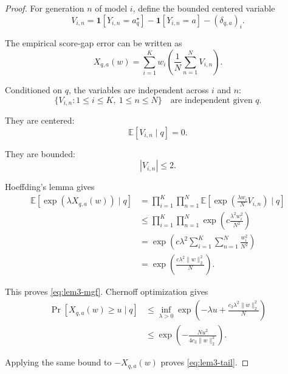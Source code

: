 \documentclass{article} %
\begin{document}
\begin{proof}
For generation \(n\) of model \(i\), define the bounded centered variable
\begin{equation}
\label{eq:lem3-proof-V}
V_{i,n}
=
\mathbf 1\!\left[Y_{i,n}=a_q^\star\right]
-
\mathbf 1\!\left[Y_{i,n}=a\right]
-
(\delta_{q,a})_i .
\end{equation}

The empirical score-gap error can be written as
\begin{equation}
\label{eq:lem3-proof-Xsum}
X_{q,a}(w)
=
\sum_{i=1}^{K}w_i
\left(
\frac1N\sum_{n=1}^{N}V_{i,n}
\right).
\end{equation}

Conditioned on \(q\), the variables are independent across \(i\) and \(n\):
\begin{equation}
\label{eq:lem3-proof-ind}
\{V_{i,n}:1\le i\le K,\ 1\le n\le N\}
\quad\text{are independent given }q .
\end{equation}

They are centered:
\begin{equation}
\label{eq:lem3-proof-centered}
\mathbb E[V_{i,n}\mid q]
=
0 .
\end{equation}

They are bounded:
\begin{equation}
\label{eq:lem3-proof-bounded}
|V_{i,n}|
\le
2 .
\end{equation}

Hoeffding's lemma gives
\begin{align}
\mathbb E\!\left[
\exp\!\left(\lambda X_{q,a}(w)\right)
\mid q
\right]
&=
\prod_{i=1}^{K}\prod_{n=1}^{N}
\mathbb E\!\left[
\exp\!\left(\frac{\lambda w_i}{N}V_{i,n}\right)
\mid q
\right]
\label{eq:lem3-proof-a}
\\
&\le
\prod_{i=1}^{K}\prod_{n=1}^{N}
\exp\!\left(
c\frac{\lambda^2 w_i^2}{N^2}
\right)
\label{eq:lem3-proof-b}
\\
&=
\exp\!\left(
c\lambda^2
\sum_{i=1}^{K}\sum_{n=1}^{N}
\frac{w_i^2}{N^2}
\right)
\label{eq:lem3-proof-c}
\\
&=
\exp\!\left(
\frac{c\lambda^2\|w\|_2^2}{N}
\right).
\label{eq:lem3-proof-d}
\end{align}

This proves \eqref{eq:lem3-mgf}.  Chernoff optimization gives
\begin{align}
\Pr\!\left[
X_{q,a}(w)\ge u
\mid q
\right]
&\le
\inf_{\lambda>0}
\exp\!\left(
-\lambda u+\frac{c_3\lambda^2\|w\|_2^2}{N}
\right)
\label{eq:lem3-proof-e}
\\
&\le
\exp\!\left(
-\frac{N u^2}{4c_3\|w\|_2^2}
\right).
\label{eq:lem3-proof-f}
\end{align}

Applying the same bound to \(-X_{q,a}(w)\) proves \eqref{eq:lem3-tail}.
\end{proof}
\end{document}

